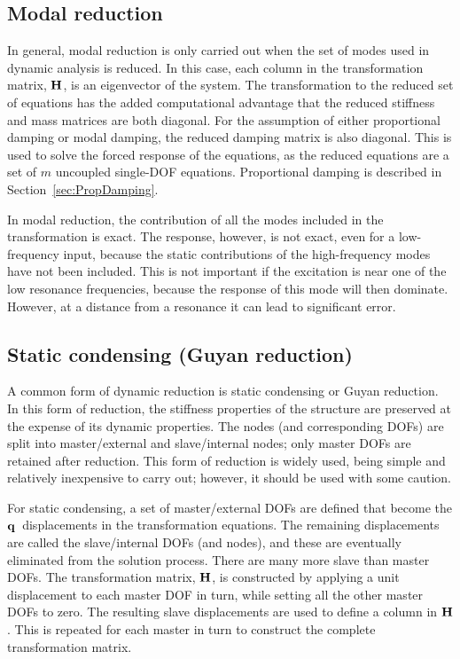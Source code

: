 \subsection{Modal reduction}

In general, modal reduction is only carried out when the set of modes used in dynamic analysis
is reduced. In this case, each column in the transformation matrix, $\bf H$, is an eigenvector
of the system. The transformation to the reduced set of equations has the added computational
advantage that the reduced stiffness and mass matrices are both diagonal. For the assumption
of either proportional damping or modal damping, the reduced damping matrix is also diagonal.
This is used to solve the forced response of the equations, as the reduced equations are a
set of $m$ uncoupled single-DOF equations. Proportional damping is described in Section~\ref{sec:PropDamping}.

In modal reduction, the contribution of all the modes included in the transformation is exact.
The response, however, is not exact, even for a low-frequency input, because the static contributions
of the high-frequency modes have not been included. This is not important if the excitation
is near one of the low resonance frequencies, because the response of this mode will then dominate.
However, at a distance from a resonance it can lead to significant error.

\subsection{Static condensing (Guyan reduction)}

A common form of dynamic reduction is static condensing or Guyan reduction. In this form of
reduction, the stiffness properties of the structure are preserved at the expense of its dynamic
properties. The nodes (and corresponding DOFs) are split into master/external and slave/internal
nodes; only master DOFs are retained after reduction. This form of reduction is widely used,
being simple and relatively inexpensive to carry out; however, it should be used with some
caution.

For static condensing, a set of master/external DOFs are defined that become the $\bf q$~displacements
in the transformation equations. The remaining displacements are called the slave/internal
DOFs (and nodes), and these are eventually eliminated from the solution process. There are
many more slave than master DOFs. The transformation matrix, $\bf H$, is constructed by applying
a unit displacement to each master DOF in turn, while setting all the other master DOFs to
zero. The resulting slave displacements are used to define a column in $\bf H$. This is repeated
for each master in turn to construct the complete transformation matrix.

